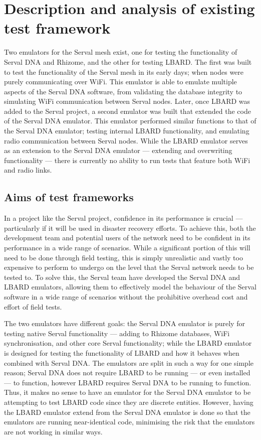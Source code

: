 \chapter{Description and analysis of existing test framework} 
\label{Chapter3} 

Two emulators for the Serval mesh exist, one for testing the functionality of Serval DNA and Rhizome, and the other for testing LBARD. 
The first was built to test the functionality of the Serval mesh in its early days; when nodes were purely communicating over WiFi. 
This emulator is able to emulate multiple aspects of the Serval DNA software, from validating the database integrity to simulating WiFi communication between Serval nodes. 
Later, once LBARD was added to the Serval project, a second emulator was built that extended the code of the Serval DNA emulator.
This emulator performed similar functions to that of the Serval DNA emulator; testing internal LBARD functionality, and emulating radio communication between Serval nodes. 
While the LBARD emulator serves as an extension to the Serval DNA emulator — extending and overwriting functionality — there is currently no ability to run tests that feature both WiFi and radio links. 


\section{Aims of test frameworks}
In a project like the Serval project, confidence in its performance is crucial — particularly if it will be used in disaster recovery efforts.
To achieve this, both the development team and potential users of the network need to be confident in its performance in a wide range of scenarios. 
While a significant portion of this will need to be done through field testing, this is simply unrealistic and vastly too expensive to perform to undergo on the level that the Serval network needs to be tested to.
To solve this, the Serval team have developed the Serval DNA and LBARD emulators, allowing them to effectively model the behaviour of the Serval software in a wide range of scenarios without the prohibitive overhead cost and effort of field tests.

The two emulators have different goals: the Serval DNA emulator is purely for testing native Serval functionality — adding to Rhizome databases, WiFi synchronisation, and other core Serval functionality; while the LBARD emulator is designed for testing the functionality of LBARD and how it behaves when combined with Serval DNA.
The emulators are split in such a way for one simple reason; Serval DNA does not require LBARD to be running — or even installed — to function, however LBARD requires Serval DNA to be running to function.
Thus, it makes no sense to have an emulator for the Serval DNA emulator to be attempting to test LBARD code since they are discrete entities.
However, having the LBARD emulator extend from the Serval DNA emulator is done so that the emulators are running near-identical code, minimising the risk that the emulators are not working in similar ways.



